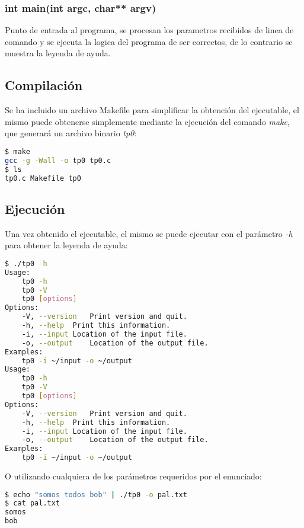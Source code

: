 \documentclass[10pt,a4paper]{article}
\begin{document}
\subsubsection{int main(int argc, char** argv)}

Punto de entrada al programa, se procesan los parametros recibidos de linea de comando y se ejecuta la logica del programa de ser correctos, de lo contrario se muestra la leyenda de ayuda.

\subsection{Compilación}

\lstset{
	breaklines=true,
  	basicstyle=\footnotesize,
}

Se ha incluido un archivo Makefile para simplificar la obtención del ejecutable, el mismo puede obtenerse simplemente mediante la ejecución del comando \textit{make}, que generará un archivo binario \textit{tp0}:

\begin{lstlisting}[language=bash]
$ make
gcc -g -Wall -o tp0 tp0.c 
$ ls
tp0.c Makefile tp0 
\end{lstlisting}

\subsection{Ejecución}

Una vez obtenido el ejecutable, el mismo se puede ejecutar con el parámetro \textit{-h} para obtener la leyenda de ayuda:

\begin{lstlisting}[language=bash]
$ ./tp0 -h
Usage:
	tp0 -h
	tp0 -V
	tp0 [options]
Options:
	-V, --version	Print version and quit.
	-h, --help	Print this information.
	-i, --input	Location of the input file.
	-o, --output	Location of the output file.
Examples:
	tp0 -i ~/input -o ~/output
Usage:
	tp0 -h
	tp0 -V
	tp0 [options]
Options:
	-V, --version	Print version and quit.
	-h, --help	Print this information.
	-i, --input	Location of the input file.
	-o, --output	Location of the output file.
Examples:
	tp0 -i ~/input -o ~/output

\end{lstlisting}

O utilizando cualquiera de los parámetros requeridos por el enunciado:

\begin{lstlisting}[language=bash]
$ echo "somos todos bob" | ./tp0 -o pal.txt
$ cat pal.txt
somos
bob
\end{lstlisting}
\end{document}
